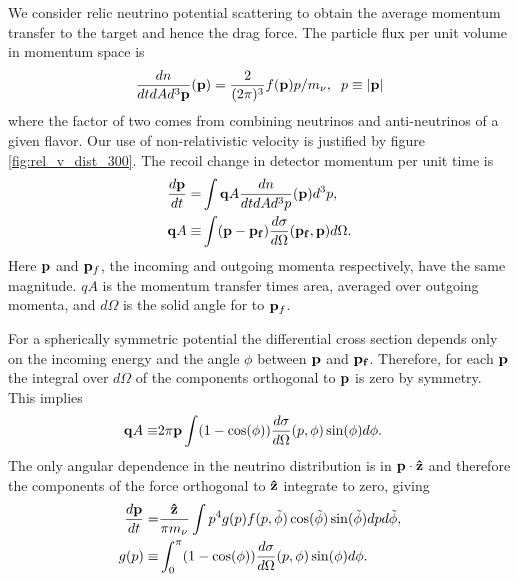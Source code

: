 We consider relic neutrino potential scattering to obtain the average momentum transfer to the target and hence the drag force. The particle flux per unit volume in momentum space is
\begin{equation}\label{dn_quantum}
\frac{dn}{dtd Ad^3{\bf p}}({\bf p})=\frac{2}{(2\pi)^3}f({\bf p})p/m_\nu,\hspace{2mm} p\equiv |{\bf p}|
\end{equation}
where the factor of two comes from combining neutrinos and anti-neutrinos of a given flavor. Our use of non-relativistic velocity is justified by figure \ref{fig:rel_v_dist_300}.  The recoil change in detector momentum per unit time is  
\begin{align}
\frac{d{\bf p}}{dt}=& \int  {\bf q}A \frac{dn}{dtdAd^3p}({\bf p})d^3p,\\
{\bf q}A\equiv &\int ({\bf p}-{\bf p_f})\frac{d\sigma}{ d\Omega}({\bf p_f},{\bf p})d\Omega.
\end{align}
Here ${\bf p}$ and ${\bf p}_f$, the incoming and outgoing momenta respectively, have the same magnitude. $qA$ is the momentum transfer times area, averaged over outgoing momenta, and $d\Omega$ is the solid angle for to ${\bf p}_f$.  

For a spherically symmetric potential the differential cross section depends only on the incoming energy and the angle $\phi$ between ${\bf p}$ and ${\bf p_f}$.  Therefore, for each ${\bf p}$ the integral over $d\Omega$ of the components orthogonal to ${\bf p}$ is zero by symmetry.  This implies
\begin{align}
{\bf q}A\equiv &2\pi{\bf p}\int(1-\cos(\phi))\frac{d\sigma}{ d\Omega}(p,\phi)\sin(\phi)d\phi.
\end{align}
The only angular dependence in the neutrino distribution is in ${\bf p}\cdot {\bf\hat z}$ and therefore the components of the force orthogonal to ${\bf \hat z}$ integrate to zero, giving
\begin{align}\label{drag}
\frac{d{\bf p}}{dt}=&\frac{{\bf\hat z}}{\pi m_\nu } \int p^4g(p) f(p,\tilde\phi) \cos(\tilde\phi) \sin(\tilde\phi) dpd\tilde\phi,\\
g(p)\equiv& \int_0^\pi(1-\cos(\phi))\frac{d\sigma}{ d\Omega}(p,\phi)\sin(\phi)d\phi.\label{geq}
\end{align}

